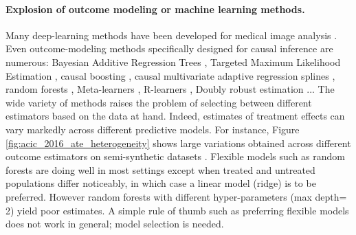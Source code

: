 \documentclass[french,12pt,twoside,a4paper]{book}
\begin{document}
\paragraph{Explosion of outcome modeling or machine learning methods.}
Many deep-learning methods have been developed for medical
image analysis \citep{shen2017deep,monshi2020deep}.
Even outcome-modeling methods specifically designed for causal
inference are numerous: Bayesian Additive Regression Trees
\citep{hill_bayesian_2011}, Targeted Maximum Likelihood Estimation
\citep{laan_targeted_2011,schuler_targeted_2017}, causal boosting
\citep{powers_methods_2018}, causal multivariate adaptive regression
splines \citep{powers_methods_2018}, random forests
\citep{wager_estimation_2018, athey_generalized_2019},
Meta-learners \citep{kunzel_metalearners_2019}, R-learners
\citep{nie_quasioracle_2017}, Doubly robust estimation
\citep{chernozhukov_double_2018}...
The wide variety of methods raises the problem
of selecting between different estimators based on the data at hand.
%
Indeed, estimates of treatment effects can vary markedly across different
predictive models. For instance, Figure \ref{fig:acic_2016_ate_heterogeneity} shows
large variations obtained across different outcome estimators on
semi-synthetic datasets \citep{dorie_automated_2019}. Flexible models
such as random forests are doing well in most settings except
when treated and untreated populations differ noticeably, in
which case a linear model (ridge) is to be preferred.
However random forests with different hyper-parameters
(max depth= 2) yield poor estimates.
A simple rule of thumb such as preferring flexible models does not work in
general; model selection is needed.
\end{document}
